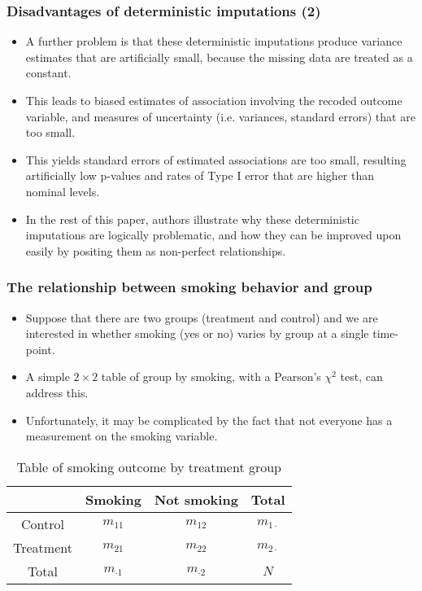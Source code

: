 \documentclass{beamer}
\begin{document}
\begin{frame}
\frametitle{Disadvantages of deterministic imputations (2)}
\begin{itemize}
\item A further problem is that these deterministic imputations produce variance estimates that are artificially small, because the missing data are treated as a constant.
\vspace{10pt} 
\item This leads to biased estimates of association involving the recoded outcome variable, and measures of
uncertainty (i.e. variances, standard errors) that are too small.
\vspace{10pt}
\item This yields standard errors of estimated associations are too small, resulting artificially low p-values and rates of Type I error that are higher than nominal levels.
\vspace{10pt}
\item In the rest of this paper, authors illustrate why these deterministic imputations are logically problematic, and
how they can be improved upon easily by positing them as non-perfect relationships.
\end{itemize}
\end{frame}
\begin{frame}
\frametitle{The relationship between smoking behavior and group}
\begin{itemize}
\item Suppose that there are two groups (treatment and control) and we are interested in whether smoking (yes or
no) varies by group at a single time-point. 
\vspace{10pt} 
\item A simple $2\times 2$ table of group by smoking, with a Pearson’s $\chi^2$ test, can address this.
\vspace{10pt} 
\item Unfortunately, it may be complicated by the fact that not everyone has a measurement on the smoking variable.
\end{itemize}
\begin{table}
\caption{Table of smoking outcome by treatment group}\label{tbl0}
\centering
\begin{tabular}{c|cc|c}\hline
 & Smoking & Not smoking & Total \\\hline
Control & $m_{11}$ & $m_{12}$ & $m_{1\cdot}$\\
Treatment  & $m_{21}$ & $m_{22}$ & $m_{2\cdot}$\\\hline
Total  & $m_{\cdot1}$ & $m_{\cdot2}$ & $N$\\\hline
\end{tabular}
\end{table}
\end{frame}
\end{document}
